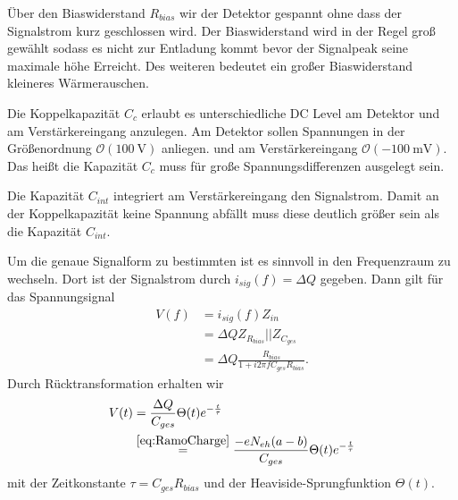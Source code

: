 Über den Biaswiderstand $R_{bias}$ wir der Detektor gespannt ohne dass der Signalstrom kurz geschlossen wird.
Der Biaswiderstand wird in der Regel groß gewählt sodass es nicht zur Entladung kommt bevor der Signalpeak seine maximale höhe Erreicht.
Des weiteren bedeutet ein großer Biaswiderstand kleineres Wärmerauschen.

Die Koppelkapazität $C_c$ erlaubt es unterschiedliche DC Level am Detektor und am Verstärkereingang anzulegen.
Am Detektor sollen Spannungen in der Größenordnung $\mathcal{O}(\SI{100}{\volt})$ anliegen.
und am Verstärkereingang $\mathcal{O}(\SI{-100}{\milli\volt})$.
Das heißt die Kapazität $C_c$ muss für große Spannungsdifferenzen ausgelegt sein.

Die Kapazität $C_{int}$ integriert am Verstärkereingang den Signalstrom.
Damit an der Koppelkapazität keine Spannung abfällt muss diese deutlich größer sein als die Kapazität $C_{int}$.

Um die genaue Signalform zu bestimmten ist es sinnvoll in den Frequenzraum zu wechseln.
Dort ist der Signalstrom durch $i_{sig}(f)=\Delta Q$ gegeben.
Dann gilt für das Spannungsignal
\begin{align*}
V(f) &= i_{sig}(f)Z_{in} \nonumber \\
&= \Delta Q Z_{R_{bias}}||Z_{C_{ges}} \nonumber \\
&= \Delta Q \frac{R_{bias}}{1 + i2\pi f C_{ges} R_{bias}}.
\end{align*}
Durch Rücktransformation erhalten wir
\begin{align*}
V(t) &= \frac{\Delta Q}{C_{ges}}\Theta(t)e^{-\frac{t}{\tau}} \nonumber \\
&\stackrel{\eqref{eq:RamoCharge}}{=} \frac{-eN_{eh}(a-b)}{C_{ges}}\Theta(t)e^{-\frac{t}{\tau}}
\end{align*}
mit der Zeitkonstante $\tau=C_{ges}R_{bias}$ und der Heaviside-Sprungfunktion $\Theta(t)$.


